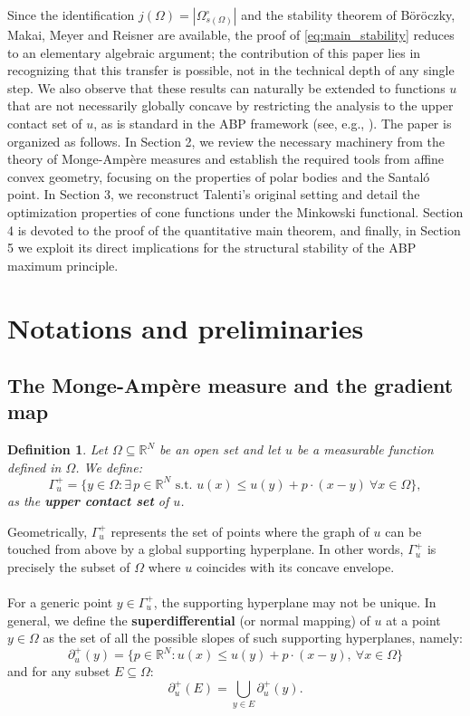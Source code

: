 \documentclass[10pt,a4paper]{amsart}
\newtheorem{definition}[theorem]{Definition}
\numberwithin{equation}{section}
\begin{document}
\noindent Since the identification $j(\Omega)=|\Omega^\circ_{s(\Omega)}|$ and the stability theorem of Böröczky, Makai, Meyer and Reisner are available, the proof of \eqref{eq:main_stability} reduces to an elementary algebraic argument; the contribution of this paper lies in recognizing that this transfer is possible, not in the technical depth of any single step.
We also observe that these results can naturally be extended to functions $u$ that are not necessarily globally concave by restricting the analysis to the upper contact set of $u$, as is standard in the ABP framework (see, e.g., \cite{gilbarg2001}).
\noindent The paper is organized as follows. In Section 2, we review the necessary machinery from the theory of Monge-Ampère measures and establish the required tools from affine convex geometry, focusing on the properties of polar bodies and the Santaló point. In Section 3, we reconstruct Talenti's original setting and detail the optimization properties of cone functions under the Minkowski functional. Section 4 is devoted to the proof of the quantitative main theorem, and finally, in Section 5 we exploit its direct implications for the structural stability of the ABP maximum principle.
\section{Notations and preliminaries}
\subsection{The Monge-Ampère measure and the gradient map}
\begin{definition}
Let $\Omega \subseteq \mathbb{R}^N$ be an open set and let $u$ be a measurable function defined in $\Omega$. We define: 
\begin{equation}
    \Gamma^+_u = \{y \in \Omega : \exists \, p \in \mathbb{R}^N \text{ s.t. } u(x) \leq u(y) + p \cdot (x-y) \ \forall x \in \Omega\},
\end{equation}as the \textbf{upper contact set} of $u$. 

\end{definition}
\noindent Geometrically, $\Gamma^+_u$ represents the set of points where the graph of $u$ can be touched from above by a global supporting hyperplane. In other words, $\Gamma^+_u$ is precisely the subset of $\Omega$ where $u$ coincides with its concave envelope.
\\ \\
\noindent For a generic point $y \in \Gamma_u^+$, the supporting hyperplane may not be unique. In general, we define the \textbf{superdifferential} (or normal mapping) of $u$ at a point $y \in \Omega$ as the set of all the possible slopes of such supporting hyperplanes, namely: 
    \begin{equation}
    \partial^+_u(y)=\{p \in \mathbb{R}^N : u(x) \leq u(y) + p \cdot(x-y), \ \forall x \in \Omega\}
    \end{equation}
    and for any subset $E \subseteq \Omega$: 
    \begin{equation}
         \partial^+_u(E) = \bigcup_{y \in E}\partial^+_u(y).   
    \end{equation}
\end{document}
